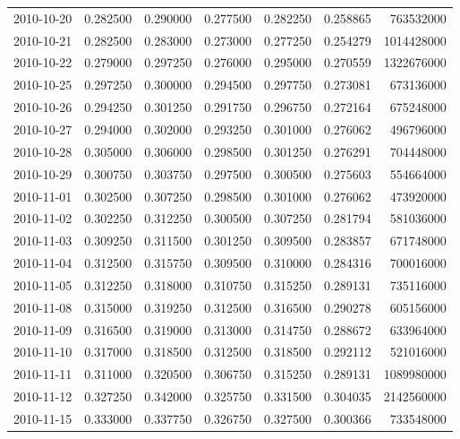 \begin{tabular}{lrrrrrr}
2010-10-20 &    0.282500 &    0.290000 &    0.277500 &    0.282250 &    0.258865 &   763532000 \\
2010-10-21 &    0.282500 &    0.283000 &    0.273000 &    0.277250 &    0.254279 &  1014428000 \\
2010-10-22 &    0.279000 &    0.297250 &    0.276000 &    0.295000 &    0.270559 &  1322676000 \\
2010-10-25 &    0.297250 &    0.300000 &    0.294500 &    0.297750 &    0.273081 &   673136000 \\
2010-10-26 &    0.294250 &    0.301250 &    0.291750 &    0.296750 &    0.272164 &   675248000 \\
2010-10-27 &    0.294000 &    0.302000 &    0.293250 &    0.301000 &    0.276062 &   496796000 \\
2010-10-28 &    0.305000 &    0.306000 &    0.298500 &    0.301250 &    0.276291 &   704448000 \\
2010-10-29 &    0.300750 &    0.303750 &    0.297500 &    0.300500 &    0.275603 &   554664000 \\
2010-11-01 &    0.302500 &    0.307250 &    0.298500 &    0.301000 &    0.276062 &   473920000 \\
2010-11-02 &    0.302250 &    0.312250 &    0.300500 &    0.307250 &    0.281794 &   581036000 \\
2010-11-03 &    0.309250 &    0.311500 &    0.301250 &    0.309500 &    0.283857 &   671748000 \\
2010-11-04 &    0.312500 &    0.315750 &    0.309500 &    0.310000 &    0.284316 &   700016000 \\
2010-11-05 &    0.312250 &    0.318000 &    0.310750 &    0.315250 &    0.289131 &   735116000 \\
2010-11-08 &    0.315000 &    0.319250 &    0.312500 &    0.316500 &    0.290278 &   605156000 \\
2010-11-09 &    0.316500 &    0.319000 &    0.313000 &    0.314750 &    0.288672 &   633964000 \\
2010-11-10 &    0.317000 &    0.318500 &    0.312500 &    0.318500 &    0.292112 &   521016000 \\
2010-11-11 &    0.311000 &    0.320500 &    0.306750 &    0.315250 &    0.289131 &  1089980000 \\
2010-11-12 &    0.327250 &    0.342000 &    0.325750 &    0.331500 &    0.304035 &  2142560000 \\
2010-11-15 &    0.333000 &    0.337750 &    0.326750 &    0.327500 &    0.300366 &   733548000 \\

\end{tabular}
